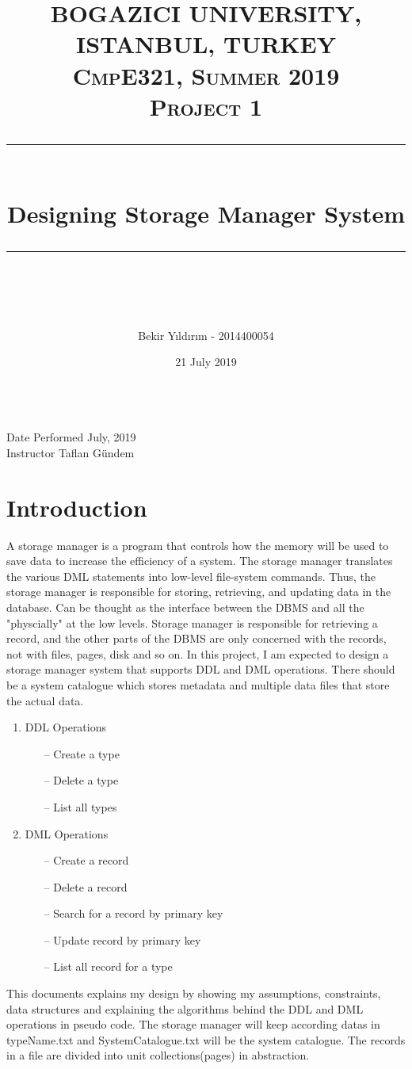 \documentclass{article}
\title{
\normalfont \normalsize 
\textsc{BOGAZICI UNIVERSITY, ISTANBUL, TURKEY \\ 
CmpE321, Summer 2019} \\
[10pt]
\textsc{\Large Project 1}
\rule{\linewidth}{0.5pt} \\[15pt] 
\huge Designing Storage Manager System \\
\rule{\linewidth}{2pt}  \\[30pt]
}
\author{Bekir Yıldırım - 2014400054}
\date{\normalsize 21 July 2019}
\newcounter{other}
\newcounter{late}
\begin{document}
\maketitle
\noindent
\textsc{} \\
[270pt]
Date Performed  July, 2019 \\
Instructor \dotfill Taflan Gündem \\

\tableofcontents{}

\break

\section{Introduction}
    A storage manager is a program that controls how the memory will be used to save data to increase the efficiency of a system. The storage manager translates the various DML statements into low-level file-system commands. Thus, the storage manager is responsible for storing, retrieving, and updating data in the database. Can be thought as the interface between the DBMS and all the "physcially" at the low levels. Storage manager is responsible for retrieving a record, and the other parts of the DBMS are only concerned with the records, not with files, pages, disk and so on. In this project, I am expected to design a storage manager system that supports DDL and DML operations. There should be a system catalogue which stores metadata and multiple data files that store the actual data. 
    \begin{enumerate}
	\item DDL Operations
    \begin{enumerate}
    	\item[--] Create a type
        \item[--] Delete a type
        \item[--] List all types
    \end{enumerate}
    \item DML Operations
    \begin{enumerate}
    	\item[--] Create a record
        \item[--] Delete a record
        \item[--] Search for a record by primary key
        \item[--] Update record by primary key
        \item[--] List all record for a type
    \end{enumerate}
\end{enumerate}
This documents explains my design by showing my assumptions, constraints, data structures and explaining the algorithms behind the DDL and DML operations in pseudo code. The storage manager will keep according datas in typeName.txt and SystemCatalogue.txt will be the system catalogue. The records in a file are divided into unit collections(pages) in abstraction.
    
\end{document}
